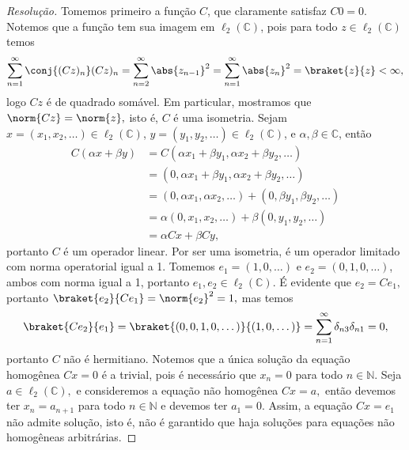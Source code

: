 \begin{proof}[Resolução]
   Tomemos primeiro a função \(C\), que claramente satisfaz \(C0 = 0\). Notemos que a função tem sua imagem em \(\ell_2(\mathbb{C})\), pois para todo \(z \in \ell_2(\mathbb{C})\) temos
   \begin{equation*}
      \sum_{n = 1}^{\infty} \conj{(Cz)_n} (Cz)_n = \sum_{n = 2}^{\infty} \abs{z_{n-1}}^2 = \sum_{n = 1}^\infty \abs{z_n}^2 = \braket{z}{z} < \infty,
   \end{equation*}
   logo \(Cz\) é de quadrado somável. Em particular, mostramos que \(\norm{Cz} = \norm{z},\) isto é, \(C\) é uma isometria. Sejam \(x = (x_1, x_2, \dots) \in \ell_2(\mathbb{C})\), \(y = (y_1, y_2, \dots) \in \ell_2(\mathbb{C})\), e \(\alpha, \beta \in \mathbb{C}\), então
   \begin{align*}
      C(\alpha x + \beta y) &= C \left(\alpha x_1 + \beta y_1, \alpha x_2 + \beta y_2, \dots\right)\\
                            &= \left(0, \alpha x_1 + \beta y_1, \alpha x_2 + \beta y_2, \dots\right)\\
                            &= (0, \alpha x_1, \alpha x_2, \dots) + (0, \beta y_1, \beta y_2, \dots)\\
                            &= \alpha (0, x_1, x_2, \dots) + \beta (0, y_1, y_2, \dots)\\
                            &= \alpha Cx + \beta Cy,
   \end{align*}
   portanto \(C\) é um operador linear. Por ser uma isometria, é um operador limitado com norma operatorial igual a 1. Tomemos \(e_1 = (1, 0, \dots)\) e \(e_2 = (0, 1, 0, \dots)\), ambos com norma igual a 1, portanto \(e_1, e_2 \in \ell_2(\mathbb{C})\). É evidente que \(e_2 = Ce_1,\) portanto \(\braket{e_2}{Ce_1} = \norm{e_2}^2 = 1,\) mas temos
   \begin{equation*}
      \braket{Ce_2}{e_1} = \braket{(0,0,1,0,\dots)}{(1,0,\dots)} = \sum_{n = 1}^\infty \delta_{n3} \delta_{n1} = 0,
   \end{equation*}
   portanto \(C\) não é hermitiano. Notemos que a única solução da equação homogênea \(Cx = 0\) é a trivial, pois é necessário que \(x_n = 0\) para todo \(n \in \mathbb{N}\). Seja \(a \in \ell_2(\mathbb{C}),\) e consideremos a equação não homogênea \(Cx = a,\) então devemos ter \(x_n = a_{n+1}\) para todo \(n \in \mathbb{N}\) e devemos ter \(a_1 = 0\). Assim, a equação \(Cx = e_1\) não admite solução, isto é, não é garantido que haja soluções para equações não homogêneas arbitrárias.


\end{proof}
